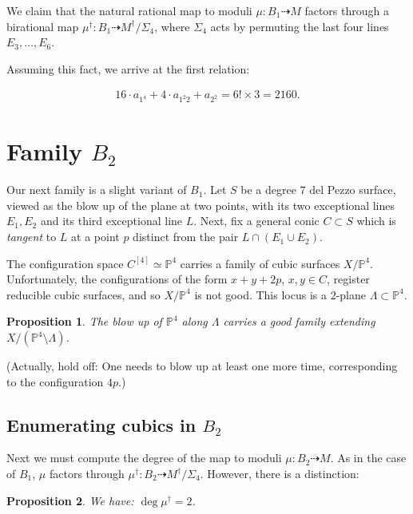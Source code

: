 \documentclass{article}
\newtheorem{proposition}{Proposition}[section]
\renewcommand{\P}{\mathbb{P}}
\newcommand{\<}{\left\langle}
\renewcommand{\>}{\right\rangle}
\begin{document}
  We claim that the natural rational map to moduli
  $\mu : B_1 \dashrightarrow M$ factors through a birational map
  $\mu^{\dagger}: B_1 \dashrightarrow M^{\dagger}/\Sigma_{4}$, where
  $\Sigma_{4}$ acts by permuting the last four lines
  $E_{3}, \dots, E_{6}$.

Assuming this fact, we arrive at the first relation:

\begin{align}
  \label{eq:relation1}
  16 \cdot a_{1^4} + 4 \cdot a_{1^2 2} + a_{2^2} = 6! \times 3 = 2160.
\end{align}

\section{Family $B_2$}
\label{sec:family-b_2}

Our next family is a slight variant of $B_1$. Let $S$ be a degree $7$
del Pezzo surface, viewed as the blow up of the plane at two points,
with its two exceptional lines $E_1, E_2$ and its third exceptional
line $L$.  Next, fix a general conic $C \subset S$ which is {\sl
  tangent} to $L$ at a point $p$ distinct from the pair
$L \cap (E_1 \cup E_2)$.

The configuration space $C^{[4]} \simeq \P^{4}$ carries a family of
cubic surfaces $X/\P^{4}$.  Unfortunately, the configurations of the
form $x+y+2p$, $x,y \in C$, register reducible cubic surfaces, and so
$X/\P^{4}$ is not good.  This locus is a $2$-plane
$\Lambda \subset \P^{4}$.

\begin{proposition}
  \label{proposition:resolveB2} The blow up of $\P^{4}$ along
  $\Lambda$ carries a good family extending
  $X/(\P^{4} \setminus \Lambda)$.
\end{proposition}
(Actually, hold off: One needs to blow up at least one more time,
corresponding to the configuration $4p$.)
\subsection{Enumerating cubics in $B_2$}
\label{sec:enum-cubics-b_2}

Next we must compute the degree of the map to moduli
$\mu: B_2 \dashrightarrow M$. As in the case of $B_1$, $\mu$ factors
through $\mu^{\dagger}: B_2 \dashrightarrow M^\dagger/\Sigma_{4}$.
However,  there is a distinction:

\begin{proposition}
  \label{proposition:deg-mudagger2}
  We have: $\deg \mu^{\dagger} = 2$.
\end{proposition}
\end{document}

